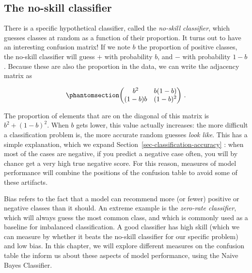 \documentclass[
  letterpaper,
]{scrbook}
\begin{document}
\subsection{The no-skill classifier}\label{the-no-skill-classifier}

There is a specific hypothetical classifier, called the \emph{no-skill
classifier}, which guesses classes at random as a function of their
proportion. It turns out to have an interesting confusion matrix! If we
note \(b\) the proportion of positive classes, the no-skill classifier
will guess \(+\) with probability \(b\), and \(-\) with probability
\(1-b\). Because these are also the proportion in the data, we can write
the adjacency matrix as

\begin{equation}\phantomsection\label{eq-classification-noskill}{
\begin{pmatrix}
b^2 & b(1-b)\\
(1-b)b & (1-b)^2 
\end{pmatrix} \,.
}\end{equation}

The proportion of elements that are on the diagonal of this matrix is
\(b^2 + (1-b)^2\). When \(b\) gets lower, this value actually increases:
the more difficult a classification problem is, the more accurate random
guesses \emph{look like}. This has a simple explanation, which we expand
Section~\ref{sec-classification-accuracy} : when most of the cases are
negative, if you predict a negative case often, you will by chance get a
very high true negative score. For this reason, measures of model
performance will combine the positions of the confusion table to avoid
some of these artifacts.


Bias refers to the fact that a model can recommend more (or fewer)
positive or negative classes than it should. An extreme example is the
\emph{zero-rate classifier}, which will always guess the most common
class, and which is commonly used as a baseline for imbalanced
classification. A good classifier has high skill (which we can measure
by whether it beats the no-skill classifier for our specific problem)
and low bias. In this chapter, we will explore different measures on the
confusion table the inform us about these aspects of model performance,
using the Naive Bayes Classifier.
\end{document}

